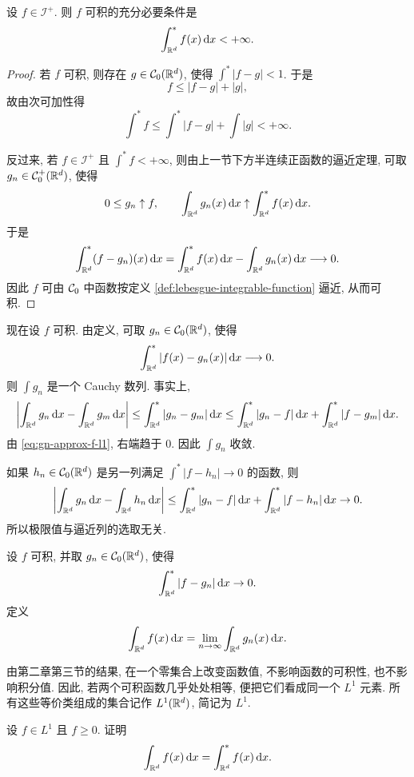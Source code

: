 \begin{thm}\label{thm:lsc-positive-integrable-iff-finite-upper-integral}
	设 \(f\in\mathcal I^+\). 则 \(f\) 可积的充分必要条件是
	\[
	\int_{\mathbb{R}^d}^{*}f(x)\,\dd x<+\infty.
	\]
\end{thm}

\begin{proof}
	若 \(f\) 可积, 则存在 \(g\in\mathcal{C}_0(\mathbb{R}^d)\), 使得 \(\int^*|f-g|<1\). 于是
	\[
	f\leq |f-g|+|g|,
	\]
	故由次可加性得
	\[
	\int^*f\leq \int^*|f-g|+\int |g|<+\infty.
	\]
	
	反过来, 若 \(f\in\mathcal I^+\) 且 \(\int^*f<+\infty\), 则由上一节下方半连续正函数的逼近定理, 可取 \(g_n\in\mathcal{C}_0^+(\mathbb{R}^d)\), 使得
	\[
	0\leq g_n\uparrow f,
	\qquad
	\int_{\mathbb{R}^d}g_n(x)\,\dd x\uparrow \int_{\mathbb{R}^d}^{*}f(x)\,\dd x.
	\]
	于是
	\[
	\int_{\mathbb{R}^d}^{*}(f-g_n)(x)\,\dd x
	=
	\int_{\mathbb{R}^d}^{*}f(x)\,\dd x-
	\int_{\mathbb{R}^d}g_n(x)\,\dd x\longrightarrow0.
	\]
	因此 \(f\) 可由 \(\mathcal{C}_0\) 中函数按定义 \ref{def:lebesgue-integrable-function} 逼近, 从而可积.
\end{proof}

现在设 \(f\) 可积. 由定义, 可取 \(g_n\in\mathcal{C}_0(\mathbb{R}^d)\), 使得
\begin{equation}
	\int_{\mathbb{R}^d}^{*}|f(x)-g_n(x)|\,\dd x\longrightarrow0.
	\label{eq:gn-approx-f-l1}
\end{equation}
则 \(\int g_n\) 是一个 Cauchy 数列. 事实上,
\[
\left|\int_{\mathbb{R}^d}g_n\,\dd x-
\int_{\mathbb{R}^d}g_m\,\dd x\right|
\leq
\int_{\mathbb{R}^d}^{*}|g_n-g_m|\,\dd x
\leq
\int_{\mathbb{R}^d}^{*}|g_n-f|\,\dd x+
\int_{\mathbb{R}^d}^{*}|f-g_m|\,\dd x.
\]
由 \eqref{eq:gn-approx-f-l1}, 右端趋于 \(0\). 因此 \(\int g_n\) 收敛.

如果 \(h_n\in\mathcal{C}_0(\mathbb{R}^d)\) 是另一列满足 \(\int^*|f-h_n|\to0\) 的函数, 则
\[
\left|\int_{\mathbb{R}^d}g_n\,\dd x-
\int_{\mathbb{R}^d}h_n\,\dd x\right|
\leq
\int_{\mathbb{R}^d}^{*}|g_n-f|\,\dd x+
\int_{\mathbb{R}^d}^{*}|f-h_n|\,\dd x\to0.
\]
所以极限值与逼近列的选取无关.

\begin{defn}[勒贝格积分]
	\label{def:lebesgue-integral}
	设 \(f\) 可积, 并取 \(g_n\in\mathcal{C}_0(\mathbb{R}^d)\), 使得
	\[
	\int_{\mathbb{R}^d}^{*}|f-g_n|\,\dd x\to0.
	\]
	定义
	\[
	\int_{\mathbb{R}^d}f(x)\,\dd x
	=
	\lim_{n\to\infty}\int_{\mathbb{R}^d}g_n(x)\,\dd x.
	\]
\end{defn}

由第二章第三节的结果, 在一个零集合上改变函数值, 不影响函数的可积性, 也不影响积分值. 因此, 若两个可积函数几乎处处相等, 便把它们看成同一个 \(L^1\) 元素. 所有这些等价类组成的集合记作 \(L^1(\mathbb{R}^d)\), 简记为 \(L^1\).

\begin{exer}\label{exer:l1-integral-equals-upper-for-nonnegative}
	设 \(f\in L^1\) 且 \(f\geq0\). 证明
	\[
	\int_{\mathbb{R}^d}f(x)\,\dd x
	=
	\int_{\mathbb{R}^d}^{*}f(x)\,\dd x.
	\]
\end{exer}

